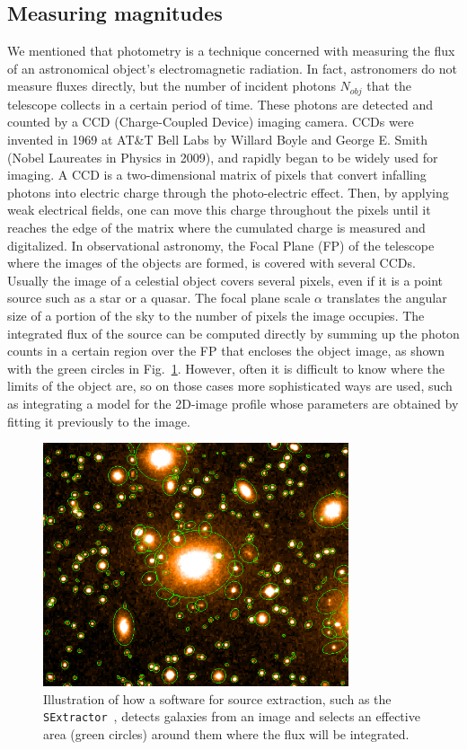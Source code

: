 \subsection{Measuring magnitudes}
\label{sec:measuring_mag}
We mentioned that photometry is a technique concerned with measuring the flux of an astronomical object's electromagnetic radiation. In fact, astronomers do not measure fluxes directly, but the number of incident photons $N_{obj}$ that the telescope collects in a certain period of time. These photons are detected and counted by a CCD (Charge-Coupled Device) imaging camera. CCDs were invented in 1969 at AT\&T Bell Labs by Willard Boyle and George E. Smith (Nobel Laureates in Physics in 2009), and rapidly began to be widely used for imaging. A CCD is a two-dimensional matrix of pixels that convert infalling photons into electric charge through the photo-electric effect. Then, by applying weak electrical fields, one can move this charge throughout the pixels until it reaches the edge of the matrix where the cumulated charge is measured and digitalized. In observational astronomy, the Focal Plane (FP) of the telescope where the images of the objects are formed, is covered with several CCDs.  Usually the image of a celestial object covers several pixels, even if it is a point source such as a star or a quasar. The focal plane scale $\alpha$ translates the angular size of a portion of the sky to the number of pixels the image occupies. The integrated flux of the source can be computed directly by summing up the photon counts in a certain region over the FP that encloses the object image, as shown with the green circles in Fig.~\ref{fig:sextractor}. However, often it is difficult to know where the limits of the object are, so on those cases more sophisticated ways are used, such as integrating a model for the 2D-image profile whose parameters are obtained by fitting it previously to the image. 
\begin{figure}
\centering
\includegraphics[width=90mm]{./plots/sun226fig.png}
\caption{Illustration of how a software for source extraction, such as the \texttt{SExtractor}~\citep{Bertin1996}, detects galaxies from an image and selects an effective area (green circles) around them where the flux will be integrated.}
\label{fig:sextractor}
\end{figure}
